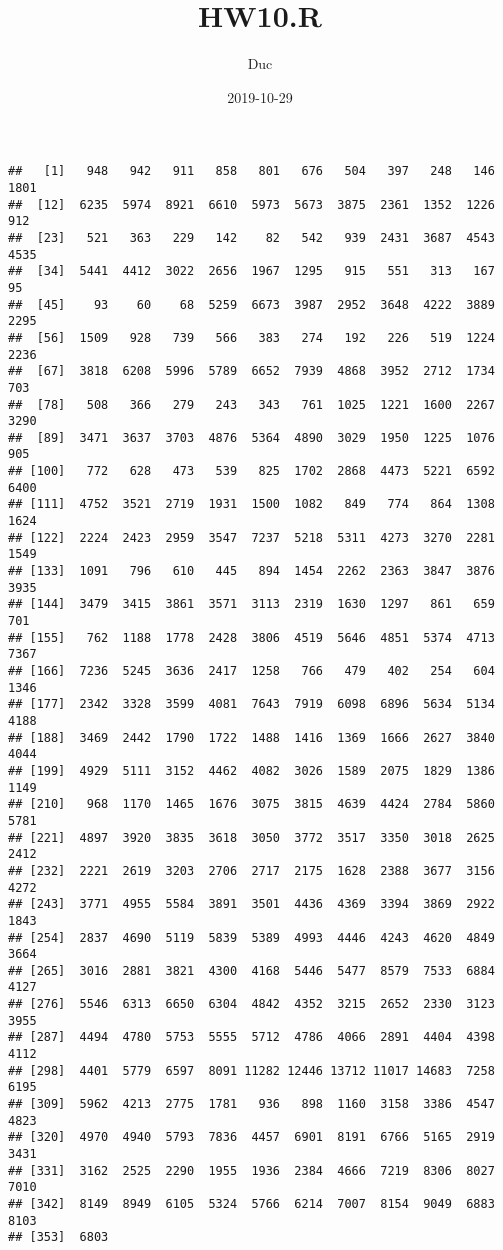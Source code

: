 \documentclass[]{article}
\title{HW10.R}
\author{Duc}
\date{2019-10-29}
\newenvironment{Shaded}{\begin{snugshade}}{\end{snugshade}}
\newcommand{\CommentTok}[1]{\textcolor[rgb]{0.56,0.35,0.01}{\textit{#1}}}
\newcommand{\DataTypeTok}[1]{\textcolor[rgb]{0.13,0.29,0.53}{#1}}
\newcommand{\KeywordTok}[1]{\textcolor[rgb]{0.13,0.29,0.53}{\textbf{#1}}}
\newcommand{\NormalTok}[1]{#1}
\newcommand{\StringTok}[1]{\textcolor[rgb]{0.31,0.60,0.02}{#1}}
\begin{document}
\maketitle

\begin{Shaded}
\end{Shaded}

\begin{verbatim}
##   [1]   948   942   911   858   801   676   504   397   248   146  1801
##  [12]  6235  5974  8921  6610  5973  5673  3875  2361  1352  1226   912
##  [23]   521   363   229   142    82   542   939  2431  3687  4543  4535
##  [34]  5441  4412  3022  2656  1967  1295   915   551   313   167    95
##  [45]    93    60    68  5259  6673  3987  2952  3648  4222  3889  2295
##  [56]  1509   928   739   566   383   274   192   226   519  1224  2236
##  [67]  3818  6208  5996  5789  6652  7939  4868  3952  2712  1734   703
##  [78]   508   366   279   243   343   761  1025  1221  1600  2267  3290
##  [89]  3471  3637  3703  4876  5364  4890  3029  1950  1225  1076   905
## [100]   772   628   473   539   825  1702  2868  4473  5221  6592  6400
## [111]  4752  3521  2719  1931  1500  1082   849   774   864  1308  1624
## [122]  2224  2423  2959  3547  7237  5218  5311  4273  3270  2281  1549
## [133]  1091   796   610   445   894  1454  2262  2363  3847  3876  3935
## [144]  3479  3415  3861  3571  3113  2319  1630  1297   861   659   701
## [155]   762  1188  1778  2428  3806  4519  5646  4851  5374  4713  7367
## [166]  7236  5245  3636  2417  1258   766   479   402   254   604  1346
## [177]  2342  3328  3599  4081  7643  7919  6098  6896  5634  5134  4188
## [188]  3469  2442  1790  1722  1488  1416  1369  1666  2627  3840  4044
## [199]  4929  5111  3152  4462  4082  3026  1589  2075  1829  1386  1149
## [210]   968  1170  1465  1676  3075  3815  4639  4424  2784  5860  5781
## [221]  4897  3920  3835  3618  3050  3772  3517  3350  3018  2625  2412
## [232]  2221  2619  3203  2706  2717  2175  1628  2388  3677  3156  4272
## [243]  3771  4955  5584  3891  3501  4436  4369  3394  3869  2922  1843
## [254]  2837  4690  5119  5839  5389  4993  4446  4243  4620  4849  3664
## [265]  3016  2881  3821  4300  4168  5446  5477  8579  7533  6884  4127
## [276]  5546  6313  6650  6304  4842  4352  3215  2652  2330  3123  3955
## [287]  4494  4780  5753  5555  5712  4786  4066  2891  4404  4398  4112
## [298]  4401  5779  6597  8091 11282 12446 13712 11017 14683  7258  6195
## [309]  5962  4213  2775  1781   936   898  1160  3158  3386  4547  4823
## [320]  4970  4940  5793  7836  4457  6901  8191  6766  5165  2919  3431
## [331]  3162  2525  2290  1955  1936  2384  4666  7219  8306  8027  7010
## [342]  8149  8949  6105  5324  5766  6214  7007  8154  9049  6883  8103
## [353]  6803
\end{verbatim}
\end{document}

